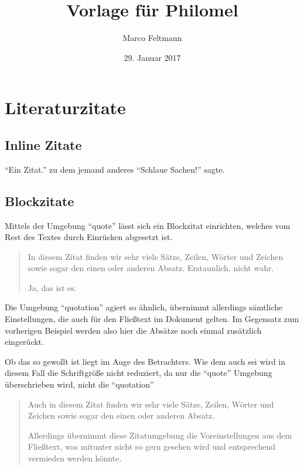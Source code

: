 \documentclass{book}
\author{Marco Feltmann}
\title{Vorlage für Philomel}
\date{29. Januar 2017}
\begin{document}
\maketitle

\tableofcontents
	
\chapter{Literaturzitate}

\section{Inline Zitate}

\enquote{Ein Zitat.}\autocite{Barry2010} zu dem jemand anderes \enquote{Schlaue Sachen!}\autocite{Griffiths2009} sagte.

\section{Blockzitate}

Mittels der Umgebung \enquote{quote} lässt sich ein Blockzitat einrichten, welches vom Rest des Textes durch Einrücken abgesetzt ist.

\begin{quote}
	In diesem Zitat finden wir sehr viele Sätze, Zeilen, Wörter und Zeichen sowie sogar den einen oder anderen Absatz. Erstaunlich, nicht wahr.
	
	Ja, das ist es.\autocite{Barry2010}
\end{quote}

Die Umgebung \enquote{quotation} agiert so ähnlich, übernimmt allerdings sämtliche Einstellungen, die auch für den Fließtext im Dokument gelten. Im Gegensatz zum vorherigen Beispiel werden also hier die Absätze noch einmal zusätzlich eingerückt.

Ob das so gewollt ist liegt im Auge des Betrachters.
Wie dem auch sei wird in diesem Fall die Schriftgröße nicht reduziert, da nur die \enquote{quote} Umgebung überschrieben wird, nicht die \enquote{quotation}
\begin{quotation} Auch in diesem Zitat finden wir sehr viele Sätze, Zeilen, Wörter und Zeichen sowie sogar den einen oder anderen Absatz. 
	
	Allerdings übernimmt diese Zitatumgebung die Voreinstellungen aus dem Fließtext, was mitunter nicht so gern gesehen wird und entsprechend vermieden werden könnte.\autocite{Barry2010}
\end{quotation}


	
\end{document}
